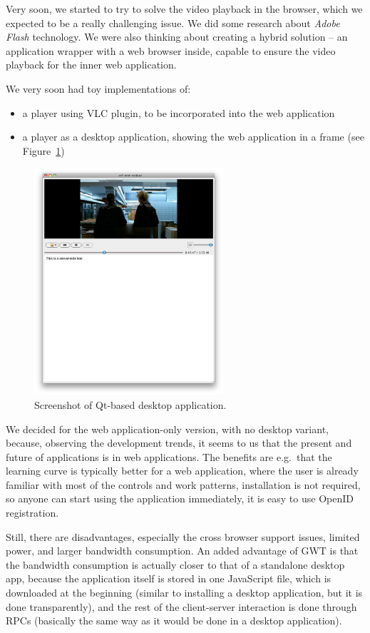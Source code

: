 Very soon, we started to try to solve the video playback in the browser, which we expected to be a really challenging issue. We did some research about \emph{Adobe Flash} technology. We were also thinking about creating a hybrid solution -- an application wrapper with a web browser inside, capable to ensure the video playback for the inner web application.

We very soon had toy implementations of:

\begin{itemize}
\item a player using VLC plugin, to be incorporated into the web application
\item a player as a desktop application, showing the web application in a frame (see Figure~\ref{fig:figures_desktop-app-player})
\end{itemize}

\begin{figure}[h!]
	\centering
		\includegraphics[width=7cm]{figures/desktop-app-player.png}
	\caption{Screenshot of Qt-based desktop application.}
	\label{fig:figures_desktop-app-player}
\end{figure}

We decided for the web application-only version, with no desktop variant, because, observing the development trends, it seems to us that the present and future of applications is in web applications. The benefits are e.g.\ that the learning curve is typically better for a web application, where the user is already familiar with most of the controls and work patterns, installation is not required, so anyone can start using the application immediately, it is easy to use OpenID registration.

Still, there are disadvantages, especially the cross browser support issues, limited power, and larger bandwidth consumption.
An added advantage of GWT is that the bandwidth consumption is actually closer to that of a standalone desktop app, because the application itself is stored in one JavaScript file, which is downloaded at the beginning (similar to installing a desktop application, but it is done transparently), and the rest of the client-server interaction is done through RPCs (basically the same way as it would be done in a desktop application).

